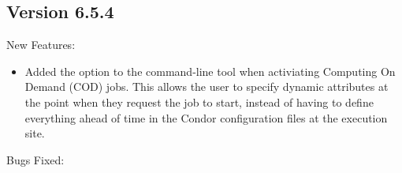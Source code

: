 \subsection{\label{sec:New-6-5-4}Version 6.5.4}

\noindent New Features:

\begin{itemize}

\item Added the  option to the  command-line
  tool when activiating Computing On Demand (COD) jobs.
  This allows the user to specify dynamic attributes at the point when
  they request the job to start, instead of having to define
  everything ahead of time in the Condor configuration files at the
  execution site.

\end{itemize}

\noindent Bugs Fixed:

